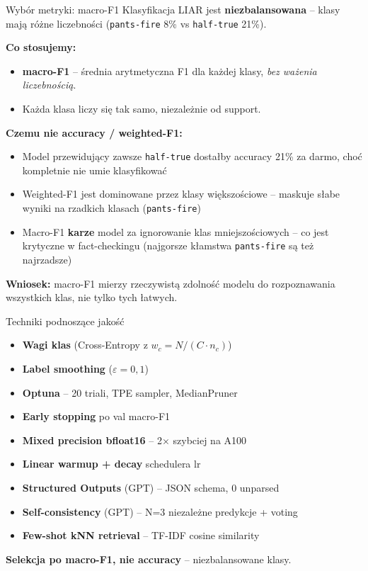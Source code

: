 \documentclass[10pt]{beamer}
\begin{document}
\begin{frame}{Wybór metryki: macro-F1}
  \small
  Klasyfikacja LIAR jest \textbf{niezbalansowana} -- klasy mają różne
  liczebności (\texttt{pants-fire} 8\% vs \texttt{half-true} 21\%).

  \vspace{0.3em}
  \textbf{Co stosujemy:}
  \begin{itemize}
    \item \textbf{macro-F1} -- średnia arytmetyczna F1 dla każdej klasy,
          \emph{bez ważenia liczebnością}.
    \item Każda klasa liczy się tak samo, niezależnie od support.
  \end{itemize}

  \vspace{0.3em}
  \textbf{Czemu nie accuracy / weighted-F1:}
  \begin{itemize}
    \item Model przewidujący zawsze \texttt{half-true} dostałby
          accuracy 21\% za darmo, choć kompletnie nie umie klasyfikować
    \item Weighted-F1 jest dominowane przez klasy większościowe --
          maskuje słabe wyniki na rzadkich klasach (\texttt{pants-fire})
    \item Macro-F1 \textbf{karze} model za ignorowanie klas mniejszościowych
          -- co jest krytyczne w fact-checkingu (najgorsze kłamstwa
          \texttt{pants-fire} są też najrzadsze)
  \end{itemize}

  \textbf{Wniosek:} macro-F1 mierzy rzeczywistą zdolność modelu do
  rozpoznawania wszystkich klas, nie tylko tych łatwych.
\end{frame}

\begin{frame}{Techniki podnoszące jakość}
  \begin{itemize}
    \item \textbf{Wagi klas} (Cross-Entropy z $w_c = N/(C \cdot n_c)$)
    \item \textbf{Label smoothing} ($\varepsilon = 0{,}1$)
    \item \textbf{Optuna} -- 20 triali, TPE sampler, MedianPruner
    \item \textbf{Early stopping} po val macro-F1
    \item \textbf{Mixed precision bfloat16} -- 2$\times$ szybciej na A100
    \item \textbf{Linear warmup + decay} schedulera lr
    \item \textbf{Structured Outputs} (GPT) -- JSON schema, 0 unparsed
    \item \textbf{Self-consistency} (GPT) -- N=3 niezależne predykcje + voting
    \item \textbf{Few-shot kNN retrieval} -- TF-IDF cosine similarity
  \end{itemize}

  \vspace{0.5em}
  \textbf{Selekcja po macro-F1, nie accuracy} -- niezbalansowane klasy.
\end{frame}
\end{document}
